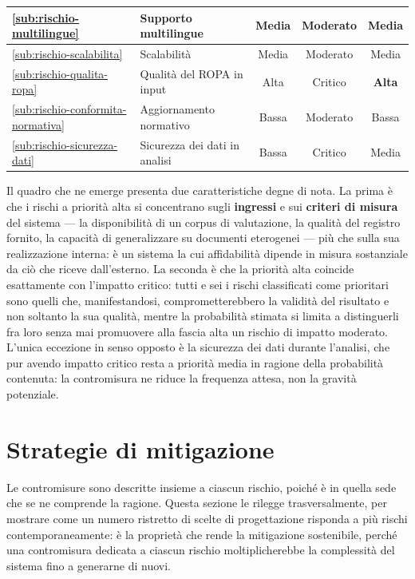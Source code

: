 \begin{table}
{\begin{tabular}{|l|l|c|c|c|}
			\hline
			\ref{sub:rischio-multilingue}          & Supporto multilingue          & Media                & Moderato         & Media             \\
			\hline
			\ref{sub:rischio-scalabilita}          & Scalabilità                   & Media                & Moderato         & Media             \\
			\hline
			\ref{sub:rischio-qualita-ropa}         & Qualità del ROPA in input     & Alta                 & Critico          & \textbf{Alta}     \\
			\hline
			\ref{sub:rischio-conformita-normativa} & Aggiornamento normativo       & Bassa                & Moderato         & Bassa             \\
			\hline
			\ref{sub:rischio-sicurezza-dati}       & Sicurezza dei dati in analisi & Bassa                & Critico          & Media             \\
			\hline
		\end{tabular}%
	}
\end{table}


Il quadro che ne emerge presenta due caratteristiche degne di nota. La prima è che i rischi a priorità alta si concentrano sugli \textbf{ingressi} e sui \textbf{criteri di misura} del sistema --- la disponibilità di un corpus di valutazione, la qualità del registro fornito, la capacità di generalizzare su documenti eterogenei --- più che sulla sua realizzazione interna: è un sistema la cui affidabilità dipende in misura sostanziale da ciò che riceve dall'esterno. La seconda è che la priorità alta coincide esattamente con l'impatto critico: tutti e sei i rischi classificati come prioritari sono quelli che, manifestandosi, comprometterebbero la validità del risultato e non soltanto la sua qualità, mentre la probabilità stimata si limita a distinguerli fra loro senza mai promuovere alla fascia alta un rischio di impatto moderato. L'unica eccezione in senso opposto è la sicurezza dei dati durante l'analisi, che pur avendo impatto critico resta a priorità media in ragione della probabilità contenuta: la contromisura ne riduce la frequenza attesa, non la gravità potenziale.



\section{Strategie di mitigazione}
\label{sec:mitigazione-rischi}
Le contromisure sono descritte insieme a ciascun rischio, poiché è in quella sede che se ne comprende la ragione. Questa sezione le rilegge trasversalmente, per mostrare come un numero ristretto di scelte di progettazione risponda a più rischi contemporaneamente: è la proprietà che rende la mitigazione sostenibile, perché una contromisura dedicata a ciascun rischio moltiplicherebbe la complessità del sistema fino a generarne di nuovi.

